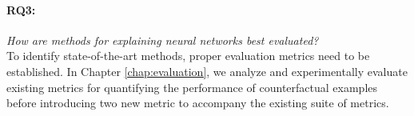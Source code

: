 \documentclass[11pt,a4paper,twoside,openright,final]{memoir}
\begin{document}
\paragraph{RQ3:} \emph{How are methods for explaining neural networks best evaluated?}\\
To identify state-of-the-art methods, proper evaluation metrics need to be established.
In Chapter \ref{chap:evaluation}, we analyze and experimentally evaluate existing metrics for quantifying the performance of counterfactual examples before introducing two new metric to accompany the existing suite of metrics. 








\end{document}
